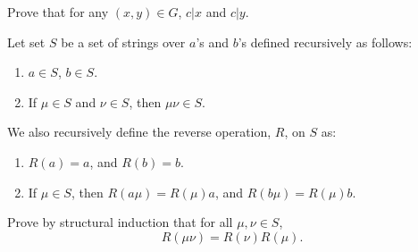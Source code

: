 \documentclass[a4paper]{exam}
\begin{document}
\begin{questions}
  Prove that for any $(x, y) \in G$, $c|x$ and $c|y$.

  \begin{solution}
  \end{solution}

  
\question
  Let set $S$ be a set of strings over $a$'s and $b$'s defined recursively as follows:
  \begin{enumerate}
  \item $a \in S$, $b \in S$.
  \item If $\mu \in S$ and $\nu \in S$, then $\mu\nu \in S$.
  \end{enumerate}
  We also recursively define the reverse operation, $R$, on $S$ as:
  \begin{enumerate}
  \item $R(a) = a$, and $R(b) = b$.
  \item If $\mu \in S$, then $R(a\mu) = R(\mu)a$, and $R(b\mu) = R(\mu)b$.
  \end{enumerate}
  Prove by structural induction that for all $\mu, \nu \in S$,
  \[ R(\mu\nu) = R(\nu)R(\mu). \]

  \begin{solution}
  \end{solution}
  
\end{questions}
\end{document}

